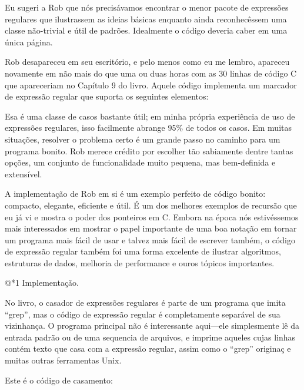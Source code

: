 Eu sugeri a Rob que nós precisávamos encontrar o menor pacote de
expressões regulares que ilustrassem as ideias básicas enquanto ainda
reconhecêssem uma classe não-trivial e útil de padrões. Idealmente o
código deveria caber em uma única página.

Rob desapareceu em seu escritório, e pelo menos como eu me lembro,
apareceu novamente em não mais do que uma ou duas horas com as 30
linhas de código C que apareceriam no Capítulo 9 do livro. Aquele
código implementa um marcador de expressão regular que suporta os
seguintes elementos:


Esa é uma classe de casos bastante útil; em minha própria experiência
de uso de expressões regulares, isso facilmente abrange 95\% de todos
os casos. Em muitas situações, resolver o problema certo é um grande
passo no caminho para um programa bonito. Rob merece crédito por
escolher tão sabiamente dentre tantas opções, um conjunto de
funcionalidade muito pequena, mas bem-definida e extensível.

A implementação de Rob em si é um exemplo perfeito de código bonito:
compacto, elegante, eficiente e útil. É um dos melhores exemplos de
recursão que eu já vi e mostra o poder dos ponteiros em C. Embora na
época nós estivéssemos mais interessados em mostrar o papel importante
de uma boa notação em tornar um programa mais fácil de usar e talvez
mais fácil de escrever também, o código de expressão regular também
foi uma forma excelente de ilustrar algoritmos, estruturas de dados,
melhoria de performance e ouros tópicos importantes.

@*1 Implementação.

No livro, o casador de expressões regulares é parte de um programa que
imita ``grep'', mas o código de expressão regular é completamente
separável de sua vizinhança. O programa principal não é interessante
aqui---ele simplesmente lê da entrada padrão ou de uma sequencia de
arquivos, e imprime aqueles cujas linhas contém texto que casa com a
expressão regular, assim como o ``grep'' originaç e muitas outras
ferramentas Unix.

Este é o código de casamento:

